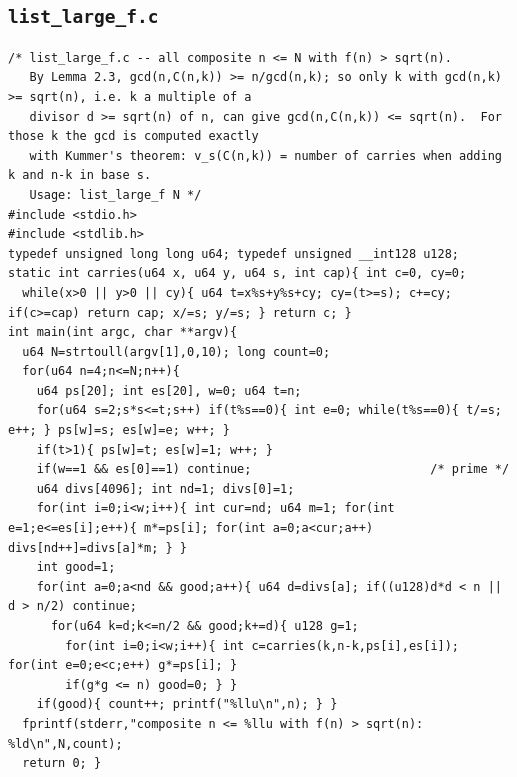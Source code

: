 \documentclass[11pt,a4paper]{article}
\theoremstyle{definition}
\begin{document}
\subsection{\texttt{list\_large\_f.c}}
\begin{lstlisting}
/* list_large_f.c -- all composite n <= N with f(n) > sqrt(n).
   By Lemma 2.3, gcd(n,C(n,k)) >= n/gcd(n,k); so only k with gcd(n,k) >= sqrt(n), i.e. k a multiple of a
   divisor d >= sqrt(n) of n, can give gcd(n,C(n,k)) <= sqrt(n).  For those k the gcd is computed exactly
   with Kummer's theorem: v_s(C(n,k)) = number of carries when adding k and n-k in base s.
   Usage: list_large_f N */
#include <stdio.h>
#include <stdlib.h>
typedef unsigned long long u64; typedef unsigned __int128 u128;
static int carries(u64 x, u64 y, u64 s, int cap){ int c=0, cy=0;
  while(x>0 || y>0 || cy){ u64 t=x%s+y%s+cy; cy=(t>=s); c+=cy; if(c>=cap) return cap; x/=s; y/=s; } return c; }
int main(int argc, char **argv){
  u64 N=strtoull(argv[1],0,10); long count=0;
  for(u64 n=4;n<=N;n++){
    u64 ps[20]; int es[20], w=0; u64 t=n;
    for(u64 s=2;s*s<=t;s++) if(t%s==0){ int e=0; while(t%s==0){ t/=s; e++; } ps[w]=s; es[w]=e; w++; }
    if(t>1){ ps[w]=t; es[w]=1; w++; }
    if(w==1 && es[0]==1) continue;                         /* prime */
    u64 divs[4096]; int nd=1; divs[0]=1;
    for(int i=0;i<w;i++){ int cur=nd; u64 m=1; for(int e=1;e<=es[i];e++){ m*=ps[i]; for(int a=0;a<cur;a++) divs[nd++]=divs[a]*m; } }
    int good=1;
    for(int a=0;a<nd && good;a++){ u64 d=divs[a]; if((u128)d*d < n || d > n/2) continue;
      for(u64 k=d;k<=n/2 && good;k+=d){ u128 g=1;
        for(int i=0;i<w;i++){ int c=carries(k,n-k,ps[i],es[i]); for(int e=0;e<c;e++) g*=ps[i]; }
        if(g*g <= n) good=0; } }
    if(good){ count++; printf("%llu\n",n); } }
  fprintf(stderr,"composite n <= %llu with f(n) > sqrt(n): %ld\n",N,count);
  return 0; }
\end{lstlisting}
\end{document}
